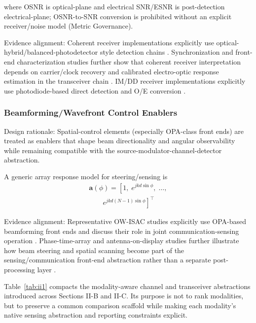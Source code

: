 \documentclass[letterpaper,journal]{IEEEtran}
\begin{document}
where OSNR is optical-plane and electrical SNR/ESNR is post-detection electrical-plane; OSNR-to-SNR conversion is prohibited without an explicit receiver/noise model (Metric Governance).

Evidence alignment: Coherent receiver implementations explicitly use optical-hybrid/balanced-photodetector style detection chains \cite{O_ISAC_028,O_ISAC_029}. Synchronization and front-end characterization studies further show that coherent receiver interpretation depends on carrier/clock recovery and calibrated electro-optic response estimation in the transceiver chain \cite{O_ISAC_063,O_ISAC_073}. IM/DD receiver implementations explicitly use photodiode-based direct detection and O/E conversion \cite{O_ISAC_001,O_ISAC_023}.

\subsubsection{Beamforming/Wavefront Control Enablers}
Design rationale: Spatial-control elements (especially OPA-class front ends) are treated as enablers that shape beam directionality and angular observability while remaining compatible with the source-modulator-channel-detector abstraction.

A generic array response model for steering/sensing is
\begin{equation}
    \begin{split}
        \mathbf{a}(\phi)=\left[1,\;e^{jkd\sin\phi},\;\ldots,\right. \\
            \left.\qquad e^{jkd(N-1)\sin\phi}\right]^{\top}
    \end{split}
\end{equation}

Evidence alignment: Representative OW-ISAC studies explicitly use OPA-based beamforming front ends and discuss their role in joint communication-sensing operation \cite{O_ISAC_061,O_ISAC_091}. Phase-time-array and antenna-on-display studies further illustrate how beam steering and spatial scanning become part of the sensing/communication front-end abstraction rather than a separate post-processing layer \cite{O_ISAC_081,O_ISAC_120}.


Table~\ref{tab:ii1} compacts the modality-aware channel and transceiver abstractions introduced across Sections II-B and II-C. Its purpose is not to rank modalities, but to preserve a common comparison scaffold while making each modality's native sensing abstraction and reporting constraints explicit.
\end{document}
